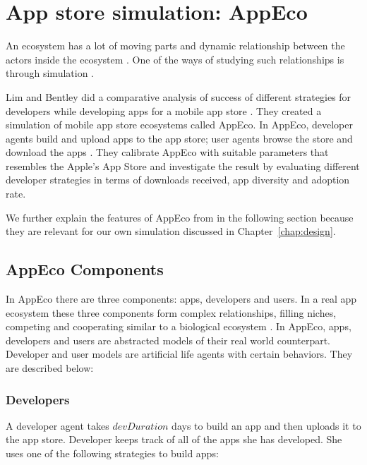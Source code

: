 \section{App store simulation: AppEco}
\label{sec:analysis_appeco}

An ecosystem has a lot of moving parts and dynamic relationship between the actors inside the ecosystem \cite{Jansen}. One of the ways of studying such relationships is through simulation \cite{castiglione2006agent}.

Lim and Bentley did a comparative analysis of success of different strategies for developers while developing apps for a mobile app store \cite{lim2012successful}. They created a simulation of mobile app store ecosystems called AppEco. In AppEco, developer agents build and upload apps to the app store; user agents browse the store and download the apps \cite{lim2012successful}. They calibrate AppEco with suitable parameters that resembles the Apple's App Store and investigate the result by evaluating different developer strategies in terms of downloads received, app diversity and adoption rate.

We further explain the features of AppEco from \cite{lim2012successful} in the following section because they are relevant for our own simulation discussed in Chapter~\ref{chap:design}.

\subsection{AppEco Components}

In AppEco there are three components: apps, developers and users. In a real app ecosystem these three components form complex relationships, filling niches, competing and cooperating similar to a biological ecosystem \cite{lin2009operating}. In AppEco, apps, developers and users are abstracted models of their real world counterpart. Developer and user models are artificial life agents with certain behaviors. They are described below:

\subsubsection*{Developers}
\label{subsubsec:appeco_components_developers}

A developer agent takes $devDuration$ days to build an app and then uploads it to the app store. Developer keeps track of all of the apps she has developed. She uses one of the following strategies to build apps:

